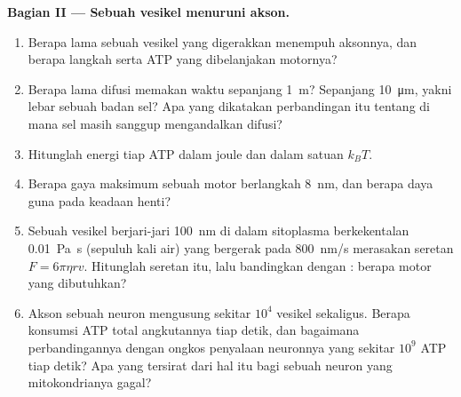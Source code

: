 \begin{problem}
\medskip
\noindent\textbf{Bagian II --- Sebuah vesikel menuruni akson.}
\begin{enumerate}[resume]
  \item Berapa lama sebuah vesikel yang digerakkan  menempuh aksonnya,
        dan berapa langkah serta ATP yang dibelanjakan motornya?
  \item Berapa lama difusi memakan waktu sepanjang \qty{1}{m}? Sepanjang
        \qty{10}{\micro m}, yakni lebar sebuah badan sel? Apa yang dikatakan
        perbandingan itu tentang di mana sel masih sanggup mengandalkan
        difusi?
  \item Hitunglah energi tiap ATP dalam joule dan dalam satuan $k_{B}T$.
  \item Berapa gaya maksimum sebuah motor berlangkah \qty{8}{nm}, dan berapa
        daya guna  pada keadaan henti?
  \item Sebuah vesikel berjari-jari \qty{100}{nm} di dalam sitoplasma
        berkekentalan \qty{0.01}{Pa.s} (sepuluh kali air) yang bergerak pada
        \qty{800}{nm/s} merasakan seretan $F = 6\pi\eta r v$. Hitunglah
        seretan itu, lalu bandingkan dengan : berapa motor yang
        dibutuhkan?
  \item Akson sebuah neuron mengusung sekitar $10^{4}$ vesikel sekaligus.
        Berapa konsumsi ATP total angkutannya tiap detik, dan bagaimana
        perbandingannya dengan ongkos penyalaan neuronnya yang sekitar
        $10^{9}$ ATP tiap detik? Apa yang tersirat dari hal itu bagi sebuah
        neuron yang mitokondrianya gagal?
\end{enumerate}


\end{problem}
